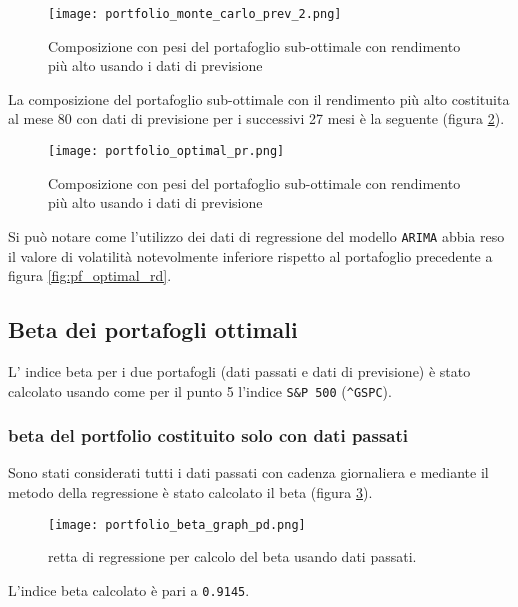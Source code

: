 \begin{figure}[p]
    \centering
    \texttt{[image: portfolio\_monte\_carlo\_prev\_2.png]}
    \caption{Composizione con pesi del portafoglio sub-ottimale con rendimento più alto usando i dati di previsione}
    \label{fig:prev_monte_carlo_2}
\end{figure}

\pagebreak

La composizione del portafoglio sub-ottimale con il rendimento più alto costituita al mese 80 con dati di previsione per
i successivi 27 mesi è la seguente (figura \ref{fig:pf_optimal_pr}).

\begin{figure}[ht]
    \centering
    \texttt{[image: portfolio\_optimal\_pr.png]}
    \caption{Composizione con pesi del portafoglio sub-ottimale con rendimento più alto usando i dati di previsione}
    \label{fig:pf_optimal_pr}
\end{figure}

Si può notare come l'utilizzo dei dati di regressione del modello \verb|ARIMA| abbia reso il valore di volatilità
notevolmente inferiore rispetto al portafoglio precedente a figura \ref{fig:pf_optimal_rd}.

\subsection{Beta dei portafogli ottimali}

L' indice beta per i due portafogli (dati passati e dati di previsione) è stato calcolato usando come per il punto 5 l'indice
\verb|S&P 500| (\verb|^GSPC|).

\subsubsection{beta del portfolio costituito solo con dati passati}

Sono stati considerati tutti i dati passati con cadenza giornaliera e mediante il metodo della regressione è stato calcolato il beta (figura \ref{fig:pf_optima_pd_beta_graph}).

\begin{figure}[ht]
    \centering
    \texttt{[image: portfolio\_beta\_graph\_pd.png]}
    \caption{retta di regressione per calcolo del beta usando dati passati.}
    \label{fig:pf_optima_pd_beta_graph}
\end{figure}

L'indice beta calcolato è pari a \verb|0.9145|.

